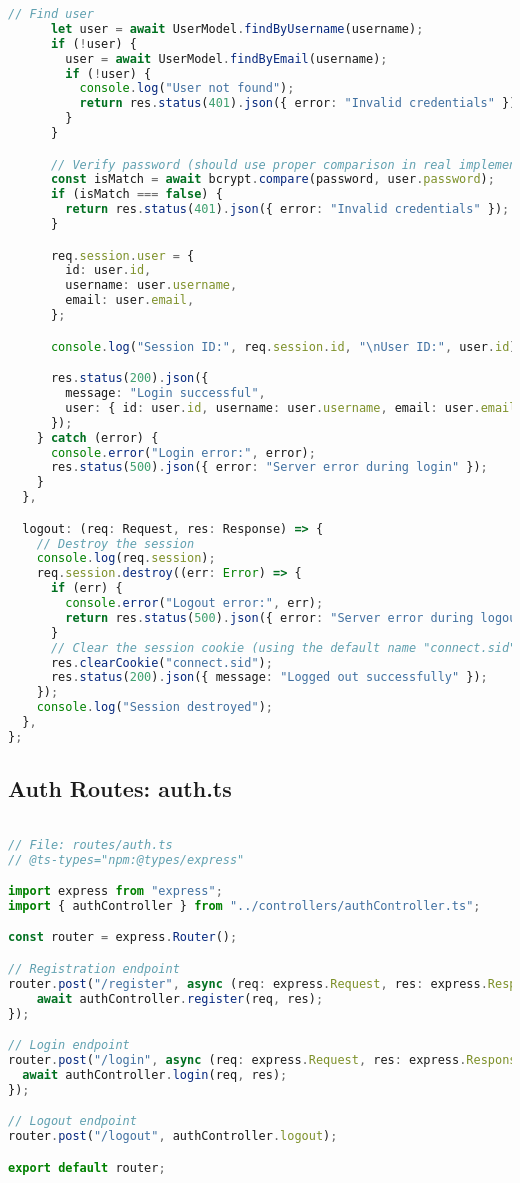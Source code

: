 \begin{lstlisting}[language=TypeScript]
      // Find user
      let user = await UserModel.findByUsername(username);
      if (!user) {
        user = await UserModel.findByEmail(username);
        if (!user) {
          console.log("User not found");
          return res.status(401).json({ error: "Invalid credentials" });
        }
      }

      // Verify password (should use proper comparison in real implementation)
      const isMatch = await bcrypt.compare(password, user.password);
      if (isMatch === false) {
        return res.status(401).json({ error: "Invalid credentials" });
      }

      req.session.user = {
        id: user.id,
        username: user.username,
        email: user.email,
      };

      console.log("Session ID:", req.session.id, "\nUser ID:", user.id);

      res.status(200).json({
        message: "Login successful",
        user: { id: user.id, username: user.username, email: user.email },
      });
    } catch (error) {
      console.error("Login error:", error);
      res.status(500).json({ error: "Server error during login" });
    }
  },

  logout: (req: Request, res: Response) => {
    // Destroy the session
    console.log(req.session);
    req.session.destroy((err: Error) => {
      if (err) {
        console.error("Logout error:", err);
        return res.status(500).json({ error: "Server error during logout" });
      }
      // Clear the session cookie (using the default name "connect.sid")
      res.clearCookie("connect.sid");
      res.status(200).json({ message: "Logged out successfully" });
    });
    console.log("Session destroyed");
  },
};
\end{lstlisting}

\subsection{Auth Routes: auth.ts}
\begin{lstlisting}[language=TypeScript]

// File: routes/auth.ts
// @ts-types="npm:@types/express"

import express from "express";
import { authController } from "../controllers/authController.ts";

const router = express.Router();

// Registration endpoint
router.post("/register", async (req: express.Request, res: express.Response) => {
    await authController.register(req, res);
});

// Login endpoint
router.post("/login", async (req: express.Request, res: express.Response) => {
  await authController.login(req, res);
});

// Logout endpoint
router.post("/logout", authController.logout);

export default router;
\end{lstlisting}

